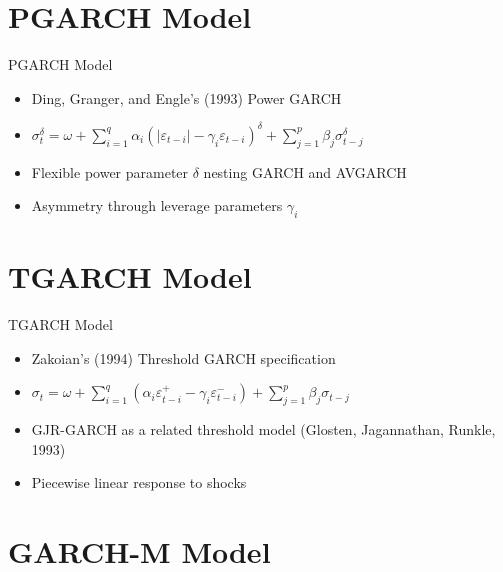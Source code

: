 \documentclass[9pt, aspectratio=169, t]{beamer}
\theoremstyle{definition}
\begin{document}
\section{PGARCH Model}

\begin{frame}{PGARCH Model}
    \begin{itemize}
        \item Ding, Granger, and Engle's (1993) Power GARCH
        \item $\sigma_t^\delta = \omega + \sum_{i=1}^{q} \alpha_i (|\varepsilon_{t-i}| - \gamma_i \varepsilon_{t-i})^\delta + \sum_{j=1}^{p} \beta_j \sigma_{t-j}^\delta$
        \item Flexible power parameter $\delta$ nesting GARCH and AVGARCH
        \item Asymmetry through leverage parameters $\gamma_i$
    \end{itemize}
\end{frame}

\section{TGARCH Model}

\begin{frame}{TGARCH Model}
    \begin{itemize}
        \item Zakoian's (1994) Threshold GARCH specification
        \item $\sigma_t = \omega + \sum_{i=1}^{q} (\alpha_i \varepsilon_{t-i}^+ - \gamma_i \varepsilon_{t-i}^-) + \sum_{j=1}^{p} \beta_j \sigma_{t-j}$
        \item GJR-GARCH as a related threshold model (Glosten, Jagannathan, Runkle, 1993)
        \item Piecewise linear response to shocks
    \end{itemize}
\end{frame}

\section{GARCH-M Model}
\end{document}
